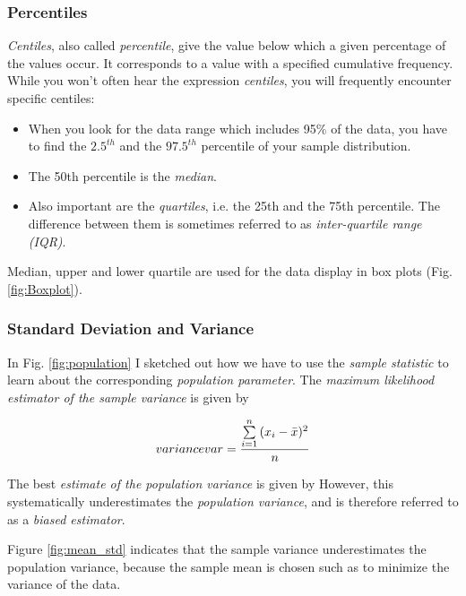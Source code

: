 \subsubsection{Percentiles}

\emph{Centiles}, also called \emph{percentile}, give the value below which a given percentage of the values occur. It corresponds to a value with a specified cumulative frequency. While you won't often hear the expression \emph{centiles}, you will frequently encounter specific centiles:

\begin{itemize}
  \item When you look for the data range which includes 95\% of the data, you have to find the $2.5^{th}$ and the $97.5^{th}$ percentile of your sample distribution.
  \item The 50th percentile is the \emph{median}.
  \item Also important are the \emph{quartiles}, i.e. the 25th and the 75th percentile. The difference between them is sometimes referred to as \emph{inter-quartile range (IQR)}.
\end{itemize}

Median, upper and lower quartile are used for the data display in box plots (Fig.\ref{fig:Boxplot}).

\subsubsection{Standard Deviation and Variance}

In Fig. \ref{fig:population} I sketched out how we have to use the \emph{sample statistic} to learn about the corresponding \emph{population parameter}.
The \emph{maximum likelihood estimator of the sample variance} is given by

\begin{equation}\label{eq_variance} \index{general}{variance}
  var = \frac{{\sum\limits_{i = 1}^n {({x_i-\bar{x}})^2} }}{n}
\end{equation}

The best \emph{estimate of the population variance} is given by
However, this systematically underestimates the \emph{population variance}, and is therefore referred to as a \emph{biased estimator}.

Figure \ref{fig:mean_std} indicates that the sample variance underestimates the population variance, because the sample mean is chosen such as to minimize the variance of the data.

